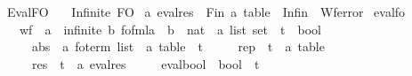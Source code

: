 %
\begin{isabellebody}%
%
%
\isadelimtheory
%
\endisadelimtheory
%
\isatagtheory
{}\isamarkupfalse%
\ Eval{\isacharunderscore}{\kern0pt}FO\isanewline
\ \ \ Infinite\ FO\isanewline
{}%
\endisatagtheory
{\isafoldtheory}%
%
\isadelimtheory
\isanewline
%
\endisadelimtheory
\isanewline
{}\isamarkupfalse%
\ {\isacharprime}{\kern0pt}a\ eval{\isacharunderscore}{\kern0pt}res\ {\isacharequal}{\kern0pt}\ Fin\ {\isachardoublequoteopen}{\isacharprime}{\kern0pt}a\ table{\isachardoublequoteclose}\ {\isacharbar}{\kern0pt}\ Infin\ {\isacharbar}{\kern0pt}\ Wf{\isacharunderscore}{\kern0pt}error\isanewline
\isanewline
{}\isamarkupfalse%
\ eval{\isacharunderscore}{\kern0pt}fo\ {\isacharequal}{\kern0pt}\isanewline
\ \ \ wf\ {\isacharcolon}{\kern0pt}{\isacharcolon}{\kern0pt}\ {\isachardoublequoteopen}{\isacharparenleft}{\kern0pt}{\isacharprime}{\kern0pt}a\ {\isacharcolon}{\kern0pt}{\isacharcolon}{\kern0pt}\ infinite{\isacharcomma}{\kern0pt}\ {\isacharprime}{\kern0pt}b{\isacharparenright}{\kern0pt}\ fo{\isacharunderscore}{\kern0pt}fmla\ {\isasymRightarrow}\ {\isacharparenleft}{\kern0pt}{\isacharprime}{\kern0pt}b\ {\isasymtimes}\ nat\ {\isasymRightarrow}\ {\isacharprime}{\kern0pt}a\ list\ set{\isacharparenright}{\kern0pt}\ {\isasymRightarrow}\ {\isacharprime}{\kern0pt}t\ {\isasymRightarrow}\ bool{\isachardoublequoteclose}\isanewline
\ \ \ \ \ abs\ {\isacharcolon}{\kern0pt}{\isacharcolon}{\kern0pt}\ {\isachardoublequoteopen}{\isacharparenleft}{\kern0pt}{\isacharprime}{\kern0pt}a\ fo{\isacharunderscore}{\kern0pt}term{\isacharparenright}{\kern0pt}\ list\ {\isasymRightarrow}\ {\isacharprime}{\kern0pt}a\ table\ {\isasymRightarrow}\ {\isacharprime}{\kern0pt}t{\isachardoublequoteclose}\isanewline
\ \ \ \ \ rep\ {\isacharcolon}{\kern0pt}{\isacharcolon}{\kern0pt}\ {\isachardoublequoteopen}{\isacharprime}{\kern0pt}t\ {\isasymRightarrow}\ {\isacharprime}{\kern0pt}a\ table{\isachardoublequoteclose}\isanewline
\ \ \ \ \ res\ {\isacharcolon}{\kern0pt}{\isacharcolon}{\kern0pt}\ {\isachardoublequoteopen}{\isacharprime}{\kern0pt}t\ {\isasymRightarrow}\ {\isacharprime}{\kern0pt}a\ eval{\isacharunderscore}{\kern0pt}res{\isachardoublequoteclose}\isanewline
\ \ \ \ \ eval{\isacharunderscore}{\kern0pt}bool\ {\isacharcolon}{\kern0pt}{\isacharcolon}{\kern0pt}\ {\isachardoublequoteopen}bool\ {\isasymRightarrow}\ {\isacharprime}{\kern0pt}t{\isachardoublequoteclose}\isanewline

\end{isabellebody}

